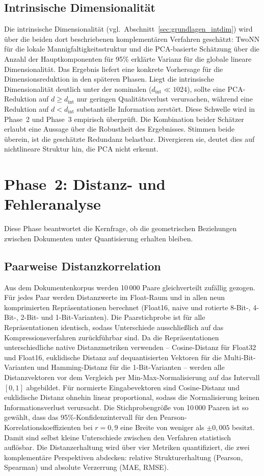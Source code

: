 \subsection{Intrinsische Dimensionalität}
%
Die intrinsische Dimensionalität (vgl.\ Abschnitt~\ref{sec:grundlagen_intdim}) wird über die beiden dort beschriebenen komplementären Verfahren geschätzt: TwoNN \cite{facco_2017_twonn} für die lokale Mannigfaltigkeitsstruktur und die PCA-basierte Schätzung über die Anzahl der Hauptkomponenten für 95\% erklärte Varianz für die globale lineare Dimensionalität.
%
Das Ergebnis liefert eine konkrete Vorhersage für die Dimensionsreduktion in den späteren Phasen.
Liegt die intrinsische Dimensionalität deutlich unter der nominalen ($d_\text{int} \ll 1024$), sollte eine PCA-Reduktion auf $d \geq d_\text{int}$ nur geringen Qualitätsverlust verursachen, während eine Reduktion auf $d < d_\text{int}$ substantielle Information zerstört.
Diese Schwelle wird in Phase~2 und Phase~3 empirisch überprüft.
%
Die Kombination beider Schätzer erlaubt eine Aussage über die Robustheit des Ergebnisses.
Stimmen beide überein, ist die geschätzte Redundanz belastbar.
Divergieren sie, deutet dies auf nichtlineare Struktur hin, die PCA nicht erkennt.
%
\section{Phase~2: Distanz- und Fehleranalyse}
\label{sec:methodik_phase2}
%
Diese Phase beantwortet die Kernfrage, ob die geometrischen Beziehungen zwischen Dokumenten unter Quantisierung erhalten bleiben.
%
\subsection{Paarweise Distanzkorrelation}
%
Aus dem Dokumentenkorpus werden 10\,000 Paare gleichverteilt zufällig gezogen.
Für jedes Paar werden Distanzwerte im Float-Raum und in allen neun komprimierten Repräsentationen berechnet (Float16, naive und rotierte 8-Bit-, 4-Bit-, 2-Bit- und 1-Bit-Varianten).
Die Paarstichprobe ist für alle Repräsentationen identisch, sodass Unterschiede ausschließlich auf das Kompressionsverfahren zurückführbar sind.
%
Da die Repräsentationen unterschiedliche native Distanzmetriken verwenden -- Cosine-Distanz für Float32 und Float16, euklidische Distanz auf dequantisierten Vektoren für die Multi-Bit-Varianten und Hamming-Distanz für die 1-Bit-Varianten -- werden alle Distanzvektoren vor dem Vergleich per Min-Max-Normalisierung auf das Intervall $[0, 1]$ abgebildet.
Für normierte Eingabevektoren sind Cosine-Distanz und euklidische Distanz ohnehin linear proportional, sodass die Normalisierung keinen Informationsverlust verursacht.
%
Die Stichprobengröße von 10\,000 Paaren ist so gewählt, dass das 95\%-Konfidenzintervall für den Pearson-Korrelationskoeffizienten bei $r = 0{,}9$ eine Breite von weniger als $\pm 0{,}005$ besitzt.
Damit sind selbst kleine Unterschiede zwischen den Verfahren statistisch auflösbar.
%
Die Distanzerhaltung wird über vier Metriken quantifiziert, die zwei komplementäre Perspektiven abdecken: relative Strukturerhaltung (Pearson, Spearman) und absolute Verzerrung (MAE, RMSE).
%
